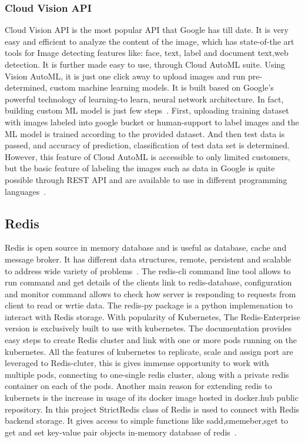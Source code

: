 \subsubsection{Cloud Vision API}

Cloud Vision API is the most popular API that Google has till date. It
is very easy and efficient to analyze the content of the image, which
has state-of-the art tools for Image detecting features like: face,
text, label and document text,web detection.  It is further made easy
to use, through Cloud AutoML suite. Using Vision AutoML, it is just
one click away to upload images and run pre-determined, custom machine
learning models. It is built based on Google’s powerful technology of
learning-to learn, neural network architecture. In fact, building
custom ML model is just few
steps~\cite{hid-sp18-602-cloud-automl}. First, uploading training
dataset with images labeled into google bucket or human-support to
label images and the ML model is trained according to the provided
dataset. And then test data is passed, and accuracy of prediction,
classification of test data set is determined. However, this feature
of Cloud AutoML is accessible to only limited customers, but the basic
feature of labeling the images such as data in Google is quite
possible through REST API and are available to use in different
programming languages~\cite{hid-sp18-602-cloud-vision}.

\subsection{Redis}

Redis is open source in memory database and is useful as database,
cache and message broker. It has different data structures, remote,
persistent and scalable to address wide variety of
problems~\cite{hid-sp18-602-redis}. The redis-cli command line tool
allows to run command and get details of the clients link to
redis-database, configuration and monitor command allows to check how
server is responding to requests from client to read or wrtie
data. The redis-py package is a python implemenation to interact with
Redis storage. With popularity of Kubernetes, The Redis-Enterprise
version is exclusively built to use with kubernetes. The documentation
provides easy steps to create Redis cluster and link with one or more
pods running on the kubernetes. All the features of kubernetes to
replicate, scale and assign port are leveraged to Redis-cluter, this
is gives immense opportunity to work with multiple pods, connecting to
one-single redis cluster, along with a private redis container on each
of the pods. Another main reason for extending redis to kubernets is
the increase in usage of its docker image hosted in docker.hub public
repository. In this project StrictRedis class of Redis is used to
connect with Redis backend storage. It gives access to simple
functions like sadd,smemeber,sget to get and set key-value pair
objects in-memory database of redis~\cite{hid-sp18-602-redis}.

